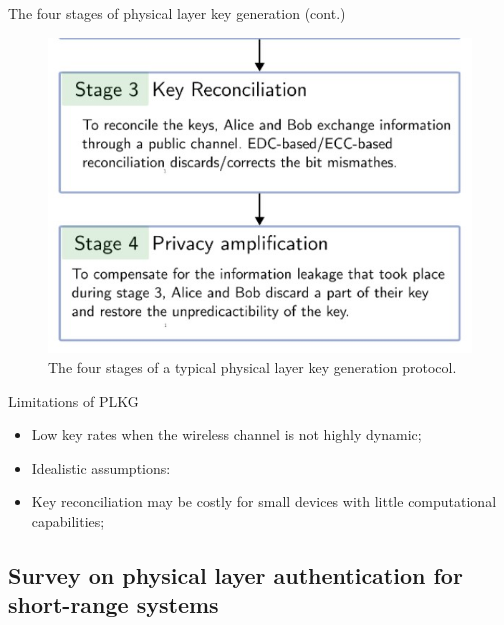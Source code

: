 \begin{frame}{The four stages of physical layer key generation (cont.)}
    
\begin{figure}
    \centering
    \includegraphics[scale = 0.7]{slides/figures/KGR2.jpg}
    \caption{The four stages of a typical physical layer key generation protocol.}
    \label{fig:PLKG2}
\end{figure}
\end{frame}


\begin{frame}{Limitations of PLKG}
    \begin{itemize}
        \item Low key rates when the wireless channel is not highly dynamic;
        \item Idealistic assumptions:
        \item Key reconciliation may be costly for small devices with little computational capabilities;
        
    \end{itemize}
\end{frame}


\subsection{Survey on physical layer authentication for short-range systems}

